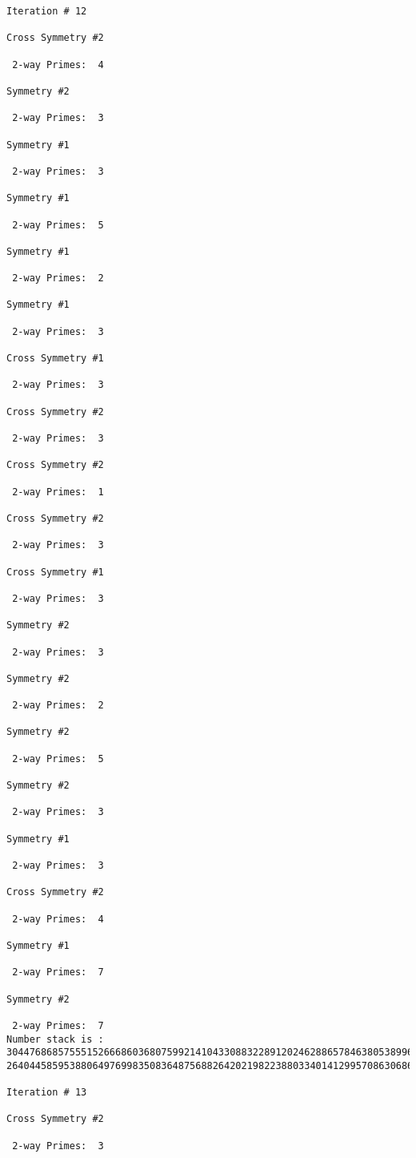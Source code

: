 \begin{verbatim}
Iteration #	12

Cross Symmetry #2

 2-way Primes: 	4

Symmetry #2

 2-way Primes: 	3

Symmetry #1

 2-way Primes: 	3

Symmetry #1

 2-way Primes: 	5

Symmetry #1

 2-way Primes: 	2

Symmetry #1

 2-way Primes: 	3

Cross Symmetry #1

 2-way Primes: 	3

Cross Symmetry #2

 2-way Primes: 	3

Cross Symmetry #2

 2-way Primes: 	1

Cross Symmetry #2

 2-way Primes: 	3

Cross Symmetry #1

 2-way Primes: 	3

Symmetry #2

 2-way Primes: 	3

Symmetry #2

 2-way Primes: 	2

Symmetry #2

 2-way Primes: 	5

Symmetry #2

 2-way Primes: 	3

Symmetry #1

 2-way Primes: 	3

Cross Symmetry #2

 2-way Primes: 	4

Symmetry #1

 2-way Primes: 	7

Symmetry #2

 2-way Primes: 	7
Number stack is :
30447686857555152666860368075992141043308832289120246288657846380538996794608835958544046240163340857
26404458595388064976998350836487568826420219822388033401412995708630686662515557586867440375804336104

Iteration #	13

Cross Symmetry #2

 2-way Primes: 	3


\end{verbatim}
